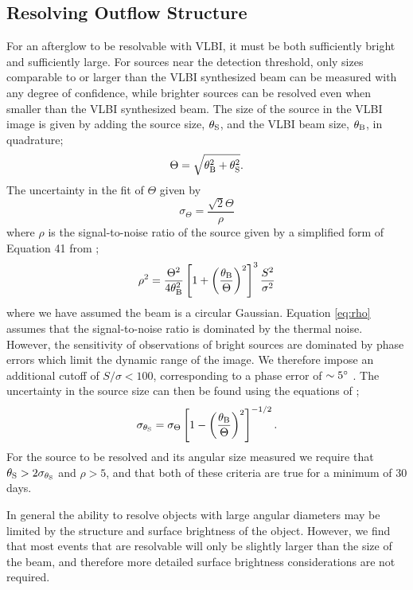 \subsection{Resolving Outflow Structure}
For an afterglow to be resolvable with VLBI, it must be both sufficiently bright and sufficiently large. For sources near the detection threshold, only sizes comparable to or larger than  the VLBI synthesized beam can be measured with any degree of confidence, while brighter sources can be resolved even when smaller than the VLBI synthesized beam. The size of the source in the VLBI image is given by adding the source size, $\theta_{\rm S}$, and the VLBI beam size, $\theta_{\rm B}$, in quadrature;
\begin{equation}
    \Theta = \sqrt{\theta_{\rm B}^2 + \theta_{\rm S}^2}.
\end{equation}
The uncertainty in the fit of $\Theta$ given by
\begin{equation}
    \sigma_\Theta = \frac{\sqrt{2}\Theta}{\rho}
\end{equation}
where $\rho$ is the signal-to-noise ratio of the source given by a simplified form of Equation 41 from \citet{1997PASP..109..166C};
\begin{equation}
    \label{eq:rho}
    \rho^2 = \frac{\Theta^2}{4\theta_{\rm B}^2} \left[1+\left(\frac{\theta_{\rm B}}{\Theta}\right)^2\right]^3 \frac{S^2}{\sigma^2}
\end{equation}
where we have assumed the beam is a circular Gaussian. Equation \eqref{eq:rho} assumes that the signal-to-noise ratio is dominated by the thermal noise. However, the sensitivity of observations of bright sources are dominated by phase errors which limit the dynamic range of the image. We therefore impose an additional cutoff of $S/\sigma < 100$, corresponding to a phase error of $\sim 5\mbox{$^\circ$}$ \citep{1999ASPC..180..275P}. The uncertainty in the source size can then be found using the equations of \citet{2017ApJ...839...35M};
\begin{equation}
    \sigma_{\theta_{\rm S}} = \sigma_{\Theta}\left[1 - \left(\frac{\theta_{\rm B}}{\Theta}\right)^2
    \right]^{-1/2}.
\end{equation}
For the source to be resolved and its angular size measured we require that $\theta_{\rm S} > 2\sigma_{\theta_{\rm S}}$ and $\rho > 5$, and that both of these criteria are true for a minimum of 30 days.

In general the ability to resolve objects with large angular diameters may be limited by the structure and surface brightness of the object. However, we find that most events that are resolvable will only be slightly larger than the size of the beam, and therefore more detailed surface brightness considerations are not required.

